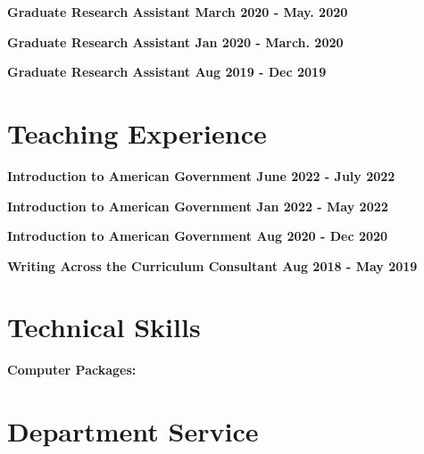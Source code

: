 \documentclass[margin]{res}
\newcommand{\fullhrulefill}{%
  \hspace*{-\sectionwidth}\hrulefill%
  }
\begin{document}
\begin{resume}
\textbf {Graduate Research Assistant \hfill {March 2020 - May. 2020} \\ }

\textbf {Graduate Research Assistant \hfill {Jan 2020 - March. 2020} \\ }

\textbf {Graduate Research Assistant \hfill {Aug 2019 - Dec 2019} \\ }


\fullhrulefill
\section {Teaching Experience}

\textbf {Introduction to American Government \hfill {June 2022 - July 2022} \\ }

\textbf {Introduction to American Government \hfill {Jan 2022 - May 2022} \\ }


\textbf {Introduction to American Government \hfill {Aug 2020 - Dec 2020} \\ }

\textbf {Writing Across the Curriculum Consultant \hfill {Aug 2018 - May 2019} \\ }

\fullhrulefill
\section{Technical Skills}
\textbf{Computer Packages:} 

\fullhrulefill
\section {Department Service}






\end{resume}
\(\)
\end{document}
